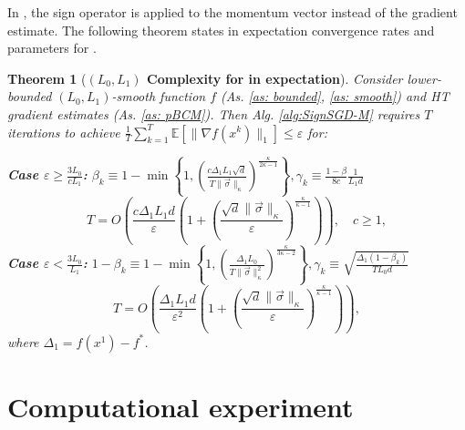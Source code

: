 \documentclass[12pt]{article}
\newcommand{\EE}{\mathbb{E}}
\newtheorem{theorem}{Theorem}
\begin{document}
In , the sign operator is applied to the momentum vector instead of the gradient estimate. The following theorem states in expectation convergence rates and parameters for .  

\begin{theorem}[\textbf{$(L_0, L_1)$ Complexity for  in expectation}]
Consider lower-bounded $(L_0,L_1)$-smooth function $f$ (As. \ref{as: bounded}, \ref{as: smooth}) and HT gradient estimates (As. \ref{as: pBCM}). Then Alg. \ref{alg:SignSGD-M} requires $T$ iterations  to achieve  $\frac{1}{T} \sum_{k=1}^{T}  \EE \left[ \|\nabla f(x^k)\|_1 \right]  \leq \varepsilon$ for:

\textbf{Case $\varepsilon \geq \frac{3L_0}{cL_1}$:} $\beta_k \equiv 1 - \min\left\{1, \left(\frac{c\Delta_1 L_1 \sqrt{d}}{T \|\Vec{\sigma}\|_\kappa}\right)^\frac{\kappa}{2\kappa - 1}\right\}, \gamma_k  \equiv \frac{1 - \beta}{8c} \frac{1}{L_1d}$ 
\begin{equation}
     T = O\left(\frac{c\Delta_1L_1d}{\varepsilon } \left(1 + \left(\frac{\sqrt{d}\|\Vec{\sigma}\|_\kappa}{\varepsilon}\right)^\frac{\kappa }{\kappa  -1}\right)\right), \quad c \geq 1,
\end{equation}
\textbf{Case $\varepsilon < \frac{3L_0}{L_1}$:} $1  - \beta_k \equiv   1 - \min\left\{1, \left(\frac{\Delta_1 L_0}{T \|\Vec{\sigma}\|_\kappa^2}\right)^\frac{\kappa}{3\kappa - 2}  \right\}, \gamma_k  \equiv \sqrt{\frac{\Delta_1 (1 - \beta_k)}{T L_0 d}}$ 
\begin{equation}
     T = O\left(\frac{\Delta_1L_1d}{\varepsilon^2 } \left(1 + \left(\frac{\sqrt{d}\|\Vec{\sigma}\|_\kappa}{\varepsilon}\right)^\frac{\kappa }{\kappa  -1}\right)\right),
\end{equation}
where $\Delta_1 = f(x^1) - f^*$.
\end{theorem}

\section{Computational experiment}
\end{document}
